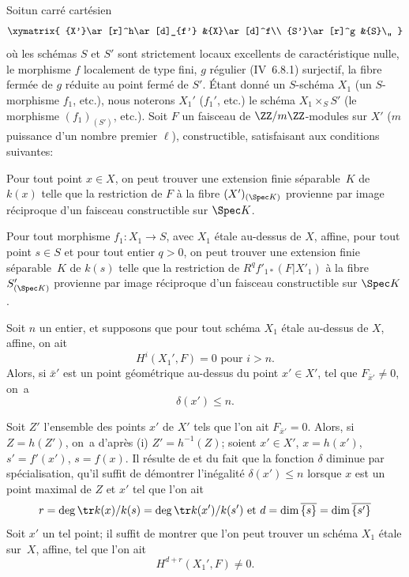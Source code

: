\begin{proposition} \label{XIV.3.5}
Soit\pageoriginale un carr\'e cart\'esien
$$
\xymatrix{
{X'}\ar[r]^h\ar[d]_{f'} &{X}\ar[d]^f\\
{S'}\ar[r]^g &{S}\,,
}
$$
o\`u les sch\'emas $S$ et $S'$ sont strictement locaux excellents de caract\'eristique nulle, le morphisme $f$ localement de type fini, $g$ r\'egulier (\textup{\EGA IV~6.8.1}) surjectif, la fibre ferm\'ee de $g$ r\'eduite au point ferm\'e de $S'$. \'Etant donn\'e un $S$-sch\'ema $X_1$ (\resp un $S$-morphisme $f_1$, etc.), nous noterons $X_1'$ (\resp $f_1'$, etc.) le sch\'ema $X_1 \times_S S'$ (\resp le morphisme $(f_1)_{(S')}$, etc.). Soit $F$ un faisceau de $\ZZ/m\ZZ$-modules sur $X'$ ($m$ puissance d'un nombre premier $\ell$), constructible, satisfaisant aux conditions suivantes:
\begin{enumeratei}
\item
Pour tout point $x \in X$, on peut trouver une extension finie s\'eparable~$K$ de $k(x)$ telle que la restriction de $F$ \`a la fibre $(X')_{(\Spec K)}$ provienne par image r\'eciproque d'un faisceau constructible sur $\Spec K$.
\item
Pour tout morphisme $f_1: X_1 \to S$, avec $X_1$ \'etale au-dessus de $X$, affine, pour tout point $s \in S$ et pour tout entier $q>0$, on peut trouver une extension finie s\'eparable~$K$ de $k(s)$ telle que la restriction de $R^q f'_{1*}(F|X'_1)$ \`a la fibre $S'_{(\Spec K)}$ provienne par image r\'eciproque d'un faisceau constructible sur $\Spec K$.
\end{enumeratei}

Soit $n$ un entier, et supposons que pour tout sch\'ema $X_1$ \'etale au-dessus de $X$, affine, on ait\pageoriginale
$$
H^i(X_1', F)=0 \text{ pour } i>n.
$$
Alors, si $\bar{x}'$ est un point g\'eom\'etrique au-dessus du point $x' \in X'$, tel que $F_{\bar{x}'} \neq 0$, on~a
$$
\delta(x') \leq n.
$$
\end{proposition}

Soit $Z'$ l'ensemble des points $x'$ de $X'$ tels que l'on ait $F_{\bar{x}'} = 0$. Alors, si $Z=h(Z')$, on~a d'apr\`es \textup{(i)} $Z' = h^{-1}(Z)$; soient $x' \in X'$, $x=h(x')$, $s'=f'(x')$, $s=f(x)$. Il r\'esulte de  et du fait que la fonction $\delta$ diminue par sp\'ecialisation, qu'il suffit de d\'emontrer l'in\'egalit\'e $\delta(x') \leq n$ lorsque $x$ est un point maximal de $Z$ et $x'$ tel que l'on ait
$$r=\deg \tr k(x)/k(s) = \deg \tr k(x')/k(s') \text{ et }d=\dim \overline{\{s\}} = \dim\overline{\{s'\}}$$
Soit $x'$ un tel point; il suffit de montrer que l'on peut trouver un sch\'ema $X_1$ \'etale sur~$X$, affine, tel que l'on ait
$$
H^{d+r}(X_1', F) \neq 0.
$$

